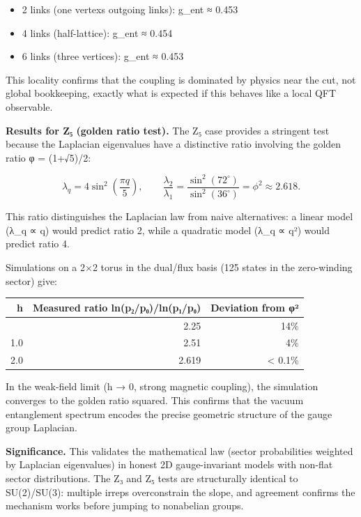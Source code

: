 \begin{itemize}
\tightlist
\item
  2 links (one vertex\textquotesingle s outgoing links): g\_ent ≈ 0.453
\item
  4 links (half-lattice): g\_ent ≈ 0.454
\item
  6 links (three vertices): g\_ent ≈ 0.453
\end{itemize}

This locality confirms that the coupling is dominated by physics near the cut, not global bookkeeping, exactly what is expected if this behaves like a local QFT observable.

\textbf{Results for Z₅ (golden ratio test).} The Z₅ case provides a stringent test because the Laplacian eigenvalues have a distinctive ratio involving the golden ratio φ = (1+√5)/2:

\[
\lambda_q = 4\sin^2\left(\frac{\pi q}{5}\right), \qquad
\frac{\lambda_2}{\lambda_1} = \frac{\sin^2(72^\circ)}{\sin^2(36^\circ)} = \phi^2 \approx 2.618.
\]

This ratio distinguishes the Laplacian law from naive alternatives: a linear model (λ\_q ∝ q) would predict ratio 2, while a quadratic model (λ\_q ∝ q²) would predict ratio 4.

Simulations on a 2×2 torus in the dual/flux basis (125 states in the zero-winding sector) give:

{\def\LTcaptype{none} %
\begin{longtable}[]{@{}rrr@{}}
\toprule\noalign{}
h & Measured ratio ln(p₂/p₀)/ln(p₁/p₀) & Deviation from φ² \\
\midrule\noalign{}
\endhead
\bottomrule\noalign{}
\endlastfoot
0.5 & 2.25 & 14\% \\
1.0 & 2.51 & 4\% \\
2.0 & 2.619 & \textless{} 0.1\% \\
\end{longtable}
}

In the weak-field limit (h → 0, strong magnetic coupling), the simulation converges to the golden ratio squared. This confirms that the vacuum entanglement spectrum encodes the precise geometric structure of the gauge group Laplacian.

\textbf{Significance.} This validates the mathematical law (sector probabilities weighted by Laplacian eigenvalues) in honest 2D gauge-invariant models with non-flat sector distributions. The Z₃ and Z₅ tests are structurally identical to SU(2)/SU(3): multiple irreps overconstrain the slope, and agreement confirms the mechanism works before jumping to nonabelian groups.

